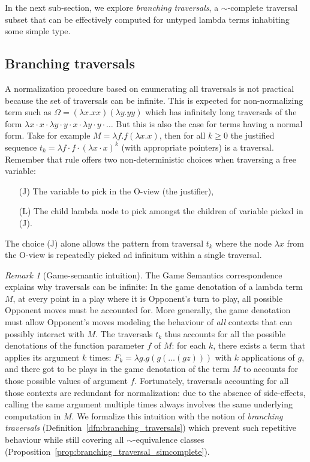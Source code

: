 \documentclass{elsarticle}
\theoremstyle{plain}
\theoremstyle{definition}
\theoremstyle{remark}
\newtheorem{remark}{Remark}[section]
\begin{document}
In the next sub-section, we explore
\emph{branching traversals}, a $\sim$-complete traversal subset that can be effectively computed for untyped lambda terms inhabiting some simple type.

\subsection{Branching traversals}

A normalization procedure based on enumerating all traversals is not practical because the set of traversals can be infinite. This is expected for non-normalizing term such as $\Omega = (\lambda x. x x)(\lambda y. y y)$ which has infinitely long traversals of the form $\lambda x \cdot x \cdot \lambda y \cdot y \cdot x \cdot \lambda y \cdot y \cdot \ldots$ But this is also the case for terms having a normal form. Take for example $M = \lambda f . f (\lambda x. x)$, then for all $k\geq0$ the justified sequence $t_k = \lambda f \cdot f \cdot (\lambda x \cdot  x)^k$ (with appropriate pointers) is a traversal.
Remember that rule  offers two non-deterministic choices when traversing a free variable:
\begin{itemize}
\item[(J)] The variable to pick in the O-view (the justifier),
\item[(L)] The child lambda node to pick amongst the children of variable picked in (J).
\end{itemize}
The choice (J) alone allows the pattern from traversal $t_k$ where the node $\lambda x$ from the O-view is repeatedly picked ad infinitum within a single traversal.

\begin{remark}[Game-semantic intuition]
The Game Semantics correspondence explains why traversals can be infinite: In the game denotation of a lambda term $M$, at every point in a play where it is Opponent's turn to play, all possible Opponent moves must be accounted for. More generally, the game denotation must allow Opponent's moves modeling the behaviour of \emph{all} contexts that can possibly interact with $M$. The traversals $t_k$ thus accounts for all the possible denotations of the function parameter $f$ of $M$: for each $k$, there exists a term that applies its argument $k$ times: $F_k = \lambda g . g (g ( \ldots (g z)))$ with $k$ applications of $g$, and there got to be plays in the game denotation of the term $M$ to accounts for those possible values of argument $f$. Fortunately, traversals accounting for all those contexts are redundant for normalization: due to the absence of side-effects, calling the same argument multiple times always involves the same underlying computation in $M$. We formalize this intuition with the notion of \emph{branching traversals} (Definition~\ref{dfn:branching_traversals})  which prevent such repetitive behaviour while still covering all $\sim$-equivalence classes (Proposition~\ref{prop:branching_traversal_simcomplete}).
\end{remark}
\end{document}
